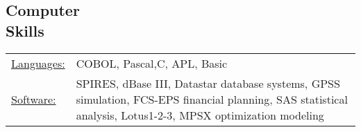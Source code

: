 \begin{resume}
\section{Computer \\ Skills}
   \begin{tabular}{l p{3in}}
    \underline{Languages:} & COBOL, Pascal,C, APL, Basic \\

     \underline{Software:} &  SPIRES, dBase III, Datastar database 
                        systems, GPSS simulation, FCS-EPS financial 
                        planning, SAS statistical analysis, 
                        Lotus1-2-3, MPSX optimization modeling 
 \end{tabular}

\end{resume} 
 



